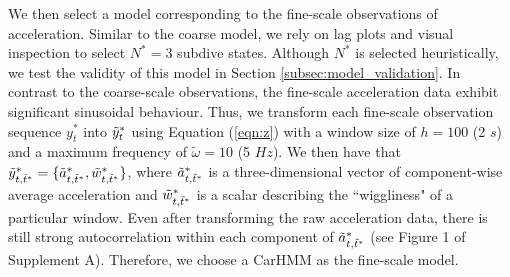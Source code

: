 We then select a model corresponding to the fine-scale observations of acceleration. Similar to the coarse model, we rely on lag plots and visual inspection to select $N^*=3$ subdive states. Although $N^*$ is selected heuristically, we test the validity of this model in Section \ref{subsec:model_validation}.
%
In contrast to the coarse-scale observations, the fine-scale acceleration data exhibit significant sinusoidal behaviour. Thus, we transform each fine-scale observation sequence $y_t^*$ into $\tilde{y}^*_t$ using Equation (\ref{eqn:z}) with a window size of $h=100$ (2 $s$) and a maximum frequency of $\tilde{\omega}=10$ (5 $Hz$). 
We then have that $\tilde{y}^*_{t,\tilde t^*} = \{\tilde{a}^*_{t,\tilde t^*},\tilde{w}^*_{t,\tilde t^*}\}$, where $\tilde{a}^*_{t,\tilde t^*}$ is a three-dimensional vector of component-wise average acceleration and $\tilde{w}^*_{t,\tilde t^*}$ is a scalar describing the ``wiggliness" of a particular window. Even after transforming the raw acceleration data, there is still strong autocorrelation within each component of $\tilde{a}^*_{t,\tilde t^*}$ (see Figure 1 of Supplement A). Therefore, we choose a CarHMM as the fine-scale model.

